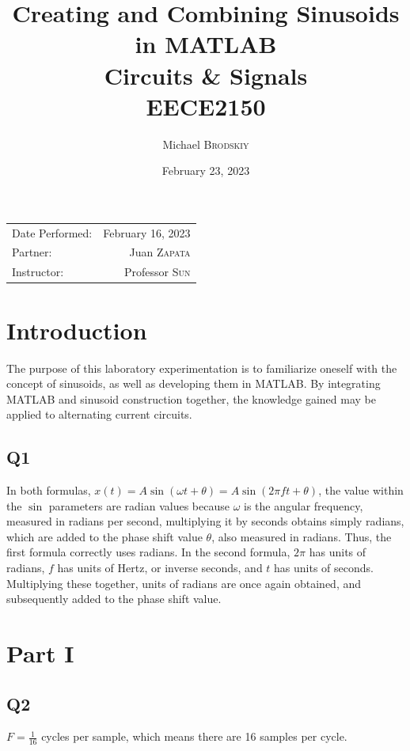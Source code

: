 \documentclass[
	letterpaper, %
	10pt, %
]{CSUniSchoolLabReport}
\title{Creating and Combining Sinusoids in MATLAB \\ Circuits \& Signals \\ EECE2150} %
\author{Michael \textsc{Brodskiy}}
\date{February 23, 2023} %
\begin{document}
\maketitle %

\begin{center}
	\begin{tabular}{l r}
		Date Performed: & February 16, 2023 \\ %
        Partner: & Juan \textsc{Zapata} \\ %
		Instructor: & Professor \textsc{Sun} %
	\end{tabular}
\end{center}

\setcounter{section}{-1}

\section{Introduction}

The purpose of this laboratory experimentation is to familiarize oneself with the concept of sinusoids, as well as developing them in MATLAB. By integrating MATLAB and sinusoid construction together, the knowledge gained may be applied to alternating current circuits.

\subsection{Q1} In both formulas, $x(t)=A\sin(\omega t+\theta)=A\sin(2\pi ft+\theta)$, the value within the $\sin$ parameters are radian values because $\omega$ is the angular frequency, measured in radians per second, multiplying it by seconds obtains simply radians, which are added to the phase shift value $\theta$, also measured in radians. Thus, the first formula correctly uses radians. In the second formula, $2\pi$ has units of radians, $f$ has units of Hertz, or inverse seconds, and $t$ has units of seconds. Multiplying these together, units of radians are once again obtained, and subsequently added to the phase shift value.

\section{Part I}

\subsection{Q2} $F=\frac{1}{16}$ cycles per sample, which means there are 16 samples per cycle.
\end{document}
